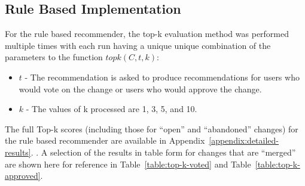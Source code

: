 \subsection{Rule Based Implementation\label{section:rule-based-top-k-eval}}

For the rule based recommender, the top-k evaluation method was performed multiple times with each run having a unique unique combination of the parameters to the function \(topk(C, t, k)\):
\begin{itemize}
    \item \(t\) - The recommendation is asked to produce recommendations for users who would vote on the change or users who would approve the change.
    \item \(k\) - The values of k processed are 1, 3, 5, and 10.
\end{itemize}

The full Top-k scores (including those for ``open'' and ``abandoned'' changes) for the rule based recommender are available in Appendix~\ref{appendix:detailed-results}. . A selection of the results in table form for changes that are ``merged'' are shown here for reference in Table~\ref{table:top-k-voted} and Table~\ref{table:top-k-approved}.


